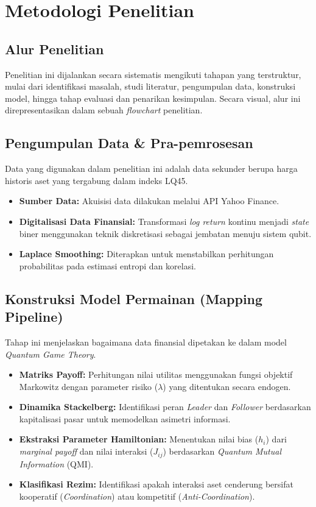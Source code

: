 \chapter{Metodologi Penelitian}

\section{Alur Penelitian}
Penelitian ini dijalankan secara sistematis mengikuti tahapan yang terstruktur, mulai dari identifikasi masalah, studi literatur, pengumpulan data, konstruksi model, hingga tahap evaluasi dan penarikan kesimpulan. Secara visual, alur ini direpresentasikan dalam sebuah \textit{flowchart} penelitian.

\section{Pengumpulan Data \& Pra-pemrosesan}
Data yang digunakan dalam penelitian ini adalah data sekunder berupa harga historis aset yang tergabung dalam indeks LQ45.
\begin{itemize}
    \item \textbf{Sumber Data:} Akuisisi data dilakukan melalui API Yahoo Finance.
    \item \textbf{Digitalisasi Data Finansial:} Transformasi \textit{log return} kontinu menjadi \textit{state} biner menggunakan teknik diskretisasi sebagai jembatan menuju sistem qubit.
    \item \textbf{Laplace Smoothing:} Diterapkan untuk menstabilkan perhitungan probabilitas pada estimasi entropi dan korelasi.
\end{itemize}

\section{Konstruksi Model Permainan (Mapping Pipeline)}
Tahap ini menjelaskan bagaimana data finansial dipetakan ke dalam model \textit{Quantum Game Theory}.
\begin{itemize}
    \item \textbf{Matriks Payoff:} Perhitungan nilai utilitas menggunakan fungsi objektif Markowitz dengan parameter risiko ($\lambda$) yang ditentukan secara endogen.
    \item \textbf{Dinamika Stackelberg:} Identifikasi peran \textit{Leader} dan \textit{Follower} berdasarkan kapitalisasi pasar untuk memodelkan asimetri informasi.
    \item \textbf{Ekstraksi Parameter Hamiltonian:} Menentukan nilai bias ($h_i$) dari \textit{marginal payoff} dan nilai interaksi ($J_{ij}$) berdasarkan \textit{Quantum Mutual Information} (QMI).
    \item \textbf{Klasifikasi Rezim:} Identifikasi apakah interaksi aset cenderung bersifat kooperatif (\textit{Coordination}) atau kompetitif (\textit{Anti-Coordination}).
\end{itemize}

